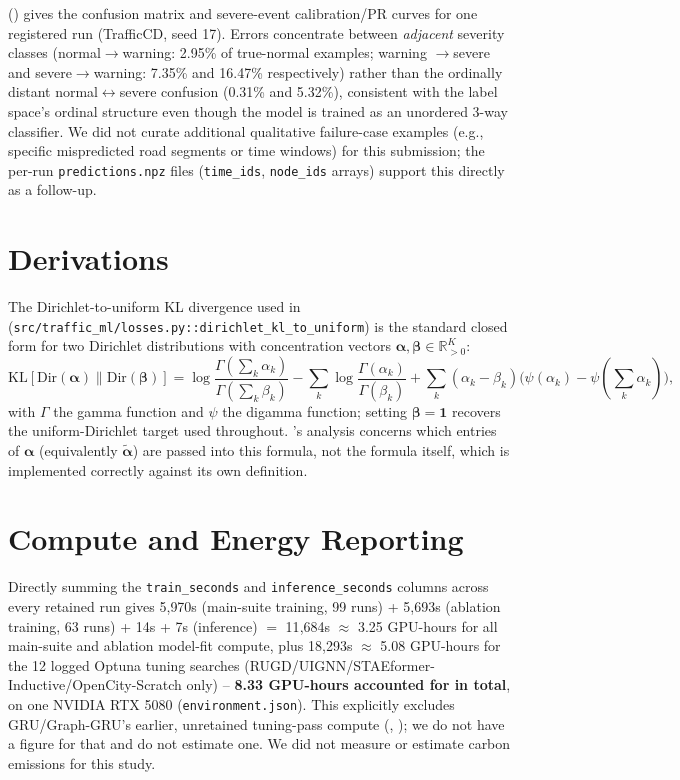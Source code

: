  () gives the confusion matrix and severe-event
calibration/PR curves for one registered run (TrafficCD, seed 17). Errors concentrate between
\emph{adjacent} severity classes (normal$\to$warning: 2.95\% of true-normal examples; warning
$\to$severe and severe$\to$warning: 7.35\% and 16.47\% respectively) rather than the ordinally
distant normal$\leftrightarrow$severe confusion (0.31\% and 5.32\%), consistent with the label
space's ordinal structure even though the model is trained as an unordered 3-way classifier. We
did not curate additional qualitative failure-case examples (e.g., specific mispredicted road
segments or time windows) for this submission; the per-run \texttt{predictions.npz} files
(\texttt{time\_ids}, \texttt{node\_ids} arrays) support this directly as a follow-up.

\section{Derivations}
\label{app:derivations}

The Dirichlet-to-uniform KL divergence used in 
(\texttt{src/traffic\_ml/losses.py::dirichlet\_kl\_to\_uniform}) is the standard closed form for
two Dirichlet distributions with concentration vectors $\boldsymbol\alpha,\boldsymbol\beta\in
\mathbb{R}_{>0}^K$:
\[
\mathrm{KL}[\mathrm{Dir}(\boldsymbol\alpha)\|\mathrm{Dir}(\boldsymbol\beta)]
= \log\frac{\Gamma(\sum_k\alpha_k)}{\Gamma(\sum_k\beta_k)} - \sum_k\log\frac{\Gamma(\alpha_k)}{\Gamma(\beta_k)}
+ \sum_k(\alpha_k-\beta_k)\big(\psi(\alpha_k)-\psi(\textstyle\sum_k\alpha_k)\big),
\]
with $\Gamma$ the gamma function and $\psi$ the digamma function; setting $\boldsymbol\beta=\mathbf 1$
recovers the uniform-Dirichlet target used throughout. 's analysis concerns
which entries of $\boldsymbol\alpha$ (equivalently $\tilde{\boldsymbol\alpha}$) are passed into this
formula, not the formula itself, which is implemented correctly against its own definition.

\section{Compute and Energy Reporting}
\label{app:compute}

Directly summing the \texttt{train\_seconds} and \texttt{inference\_seconds} columns across every
retained run gives 5{,}970s (main-suite training, 99 runs) + 5{,}693s (ablation training, 63 runs)
+ 14s + 7s (inference) $=$ 11{,}684s $\approx$ 3.25 GPU-hours for all main-suite and ablation
model-fit compute, plus 18{,}293s $\approx$ 5.08 GPU-hours for the 12 logged Optuna tuning searches
(RUGD/UIGNN/STAEformer-Inductive/OpenCity-Scratch only) --
\textbf{8.33 GPU-hours accounted for in total}, on one NVIDIA RTX 5080 (\texttt{environment.json}).
This explicitly excludes GRU/Graph-GRU's earlier, unretained tuning-pass compute (,
); we do not have a figure for that and do not estimate one. We did not
measure or estimate carbon emissions for this study.


